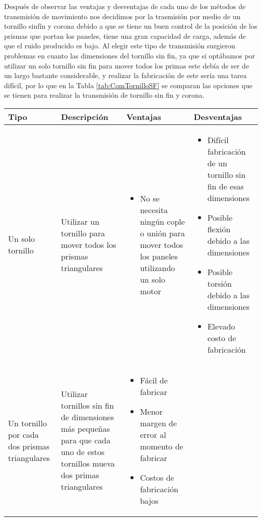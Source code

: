 Después de observar las ventajas y desventajas de cada uno de los métodos de transmisión de movimiento nos decidimos por la trasmisión por medio de un tornillo sinfín y corona debido a que se tiene un buen control de la posición de los prismas que portan los paneles, tiene una gran capacidad de carga, además de que el ruido producido es bajo. Al elegir este tipo de transmisión surgieron problemas en cuanto las dimensiones del tornillo sin fin, ya que si optábamos por utilizar un solo tornillo sin fin para mover todos los primas este debía de ser de un largo bastante considerable, y realizar la fabricación de este sería una tarea difícil, por lo que en la Tabla \ref{tab:ComTornilloSF} se comparan las opciones que se tienen para realizar la transmisión de tornillo sin fin y corona.
\begin{center}
\footnotesize
    \begin{longtable}[!htb]{| m{7em} | m{10em} | m{12em}| m{12em}|}
    \hline
    \textbf{Tipo}& \textbf{Descripción} & \textbf{Ventajas} & \textbf{Desventajas}\\
    \hline\hline
    Un solo tornillo & Utilizar un tornillo para mover todos los prismas triangulares &
    \begin{itemize}
        \item No se necesita ningún cople o unión para mover todos los paneles utilizando un solo motor
    \end{itemize}
    & 
    \begin{itemize}
        \item Difícil fabricación de un tornillo sin fin de esas dimensiones
        \item Posible flexión debido a las dimensiones 
        \item Posible torsión debido a las dimensiones
        \item Elevado costo de fabricación
    \end{itemize}\\
    \hline
    Un tornillo por cada dos prismas triangulares & Utilizar tornillos sin fin de dimensiones más pequeñas para que cada uno de estos tornillos mueva dos primas triangulares &
    \begin{itemize}
        \item Fácil de fabricar
        \item Menor margen de error al momento de fabricar
        \item Costos de fabricación bajos

\end{itemize}
\end{longtable}
\end{center}
